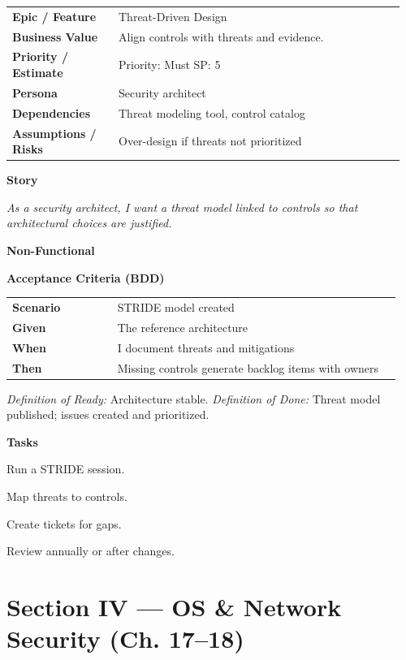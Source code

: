 \documentclass[11pt,letterpaper]{article}
\makeatletter
\newenvironment{kvtable}{%
  \par\noindent\begin{tabular}{@{}>{\raggedright\bfseries\arraybackslash}p{0.26\linewidth} >{\raggedright\arraybackslash}p{0.70\linewidth}@{}}
}{\end{tabular}\par}
\newenvironment{bdd}{%
  \par\noindent\begin{tabular}{@{}>{\raggedright\bfseries\arraybackslash}p{0.26\linewidth} >{\raggedright\arraybackslash}p{0.70\linewidth}@{}}
}{\end{tabular}\par}
\newcommand{\DoRDoD}[2]{%
  \vspace{0.35em}
  {\footnotesize\color{Muted}%
    \textit{Definition of Ready:} #1 \; \textbullet\;
    \textit{Definition of Done:} #2%
  }%
}
\newenvironment{storycard}[2]{%
  \begin{tcolorbox}[cloudcard, title={#1 --- #2}]%
}{\end{tcolorbox}}
\newcommand{\sectionlabel}[1]{\par\vspace{0.35em}\textbf{#1}\par}
\makeatother
\begin{document}
\begin{storycard}{CCS-16}{Ch. 16 — Secure Cloud Architecture}
\begin{kvtable}
Epic / Feature & Threat-Driven Design\\
Business Value & Align controls with threats and evidence.\\
Priority / Estimate & Priority: Must \quad SP: 5\\
Persona & Security architect\\
Dependencies & Threat modeling tool, control catalog\\
Assumptions / Risks & Over-design if threats not prioritized\\
\end{kvtable}
\sectionlabel{Story}
\textit{As a security architect, I want a threat model linked to controls so that architectural choices are justified.}
\sectionlabel{Non-Functional}\;
\sectionlabel{Acceptance Criteria (BDD)}
\begin{bdd}
Scenario & STRIDE model created\\
Given & The reference architecture\\
When & I document threats and mitigations\\
Then & Missing controls generate backlog items with owners\\
\end{bdd}
\DoRDoD{Architecture stable.}{Threat model published; issues created and prioritized.}
\sectionlabel{Tasks}
\begin{checklist}
\item Run a STRIDE session.
\item Map threats to controls.
\item Create tickets for gaps.
\item Review annually or after changes.
\end{checklist}
\end{storycard}

\section{Section IV — OS \& Network Security (Ch. 17--18)}
\end{document}
